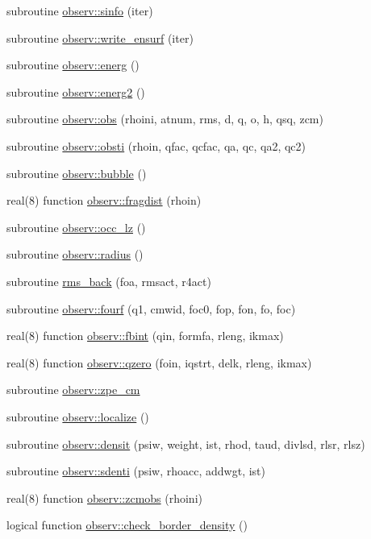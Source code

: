 \begin{DoxyCompactItemize}
\item 
subroutine \hyperlink{namespaceobserv_a95e1935bb63b583b0ca0575f0f80f1c3}{observ\+::sinfo} (iter)
\item 
subroutine \hyperlink{namespaceobserv_ae5279f904be9922f8f914643db509aad}{observ\+::write\+\_\+ensurf} (iter)
\item 
subroutine \hyperlink{namespaceobserv_a3f8b0d008c221139e4f24d70634bfeff}{observ\+::energ} ()
\item 
subroutine \hyperlink{namespaceobserv_a55eac5863325b72c55b82394b9fbc025}{observ\+::energ2} ()
\item 
subroutine \hyperlink{namespaceobserv_a5627b5a74b86f1ea84da4e3d8ef274db}{observ\+::obs} (rhoini, atnum, rms, d, q, o, h, qsq, zcm)
\item 
subroutine \hyperlink{namespaceobserv_a8210a4df1b28eb34510fd9d4bb9851c3}{observ\+::obsti} (rhoin, qfac, qcfac, qa, qc, qa2, qc2)
\item 
subroutine \hyperlink{namespaceobserv_a5dceadb61af708e4d37dc5f2d5ee3284}{observ\+::bubble} ()
\item 
real(8) function \hyperlink{namespaceobserv_aad82119702a9563bd04eac2d050e8e47}{observ\+::fragdist} (rhoin)
\item 
subroutine \hyperlink{namespaceobserv_ac0ebb6d3f156fbd0921aa9d43978dc5d}{observ\+::occ\+\_\+lz} ()
\item 
subroutine \hyperlink{namespaceobserv_ab795c872e2b2dddd7f5c7a519f49ab92}{observ\+::radius} ()
\item 
subroutine \hyperlink{m__observ_8f90_af2f533d64650a60e4a2d8e7a102e1525}{rms\+\_\+back} (foa, rmsact, r4act)
\item 
subroutine \hyperlink{namespaceobserv_a6696dab60b04302875af1a9b7ab61fe6}{observ\+::fourf} (q1, cmwid, foc0, fop, fon, fo, foc)
\item 
real(8) function \hyperlink{namespaceobserv_a7a329dea033cb1606639d5deb6aaad29}{observ\+::fbint} (qin, formfa, rleng, ikmax)
\item 
real(8) function \hyperlink{namespaceobserv_a8fe61665a4670e6215ecc9db5d6478b2}{observ\+::qzero} (foin, iqstrt, delk, rleng, ikmax)
\item 
subroutine \hyperlink{namespaceobserv_a4ccae3e6386e9f57519189540c0a541c}{observ\+::zpe\+\_\+cm}
\item 
subroutine \hyperlink{namespaceobserv_a56772dd19b8a5af560935df604c30315}{observ\+::localize} ()
\item 
subroutine \hyperlink{namespaceobserv_a6400bb0d7fd8f21ce1ff763fcfebe70d}{observ\+::densit} (psiw, weight, ist, rhod, taud, divlsd, rlsr, rlsz)
\item 
subroutine \hyperlink{namespaceobserv_a7bdfb81b161bdc113076f9e9cdc24b46}{observ\+::sdenti} (psiw, rhoacc, addwgt, ist)
\item 
real(8) function \hyperlink{namespaceobserv_ac34a8711125703b516871b1323fcffe5}{observ\+::zcmobs} (rhoini)
\item 
logical function \hyperlink{namespaceobserv_ad3ede781f00b650dd45cf509ffcd81b5}{observ\+::check\+\_\+border\+\_\+density} ()
\end{DoxyCompactItemize}
